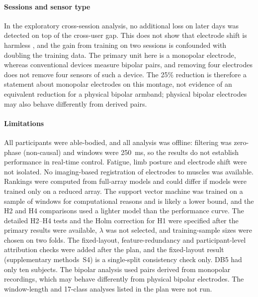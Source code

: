 \paragraph{Sessions and sensor type}
In the exploratory cross-session analysis, no additional loss on later days was detected on top of the cross-user gap. This does not show that electrode shift is harmless \citep{hargrove2006effect,kaufmann2010fluctuating,vidovic2016improving}, and the gain from training on two sessions is confounded with doubling the training data. The primary unit here is a monopolar electrode, whereas conventional devices measure bipolar pairs, and removing four electrodes does not remove four sensors of such a device.  The 25\% reduction is therefore a statement about monopolar electrodes on this montage, not evidence of an equivalent reduction for a physical bipolar armband; physical bipolar electrodes may also behave differently from derived pairs.

\paragraph{Limitations}
All participants were able-bodied, and all analysis was offline: filtering was zero-phase (non-causal) and windows were 250~ms, so the results do not establish performance in real-time control. Fatigue, limb posture and electrode shift were not isolated. No imaging-based registration of electrodes to muscles was available. Rankings were computed from full-array models and could differ if models were trained only on a reduced array. The support vector machine was trained on a sample of windows for computational reasons and is likely a lower bound, and the H2 and H4 comparisons used a lighter model than the performance curve. The detailed H2--H4 tests and the Holm correction for H1 were specified after the primary results were available, $\lambda$ was not selected, and training-sample sizes were chosen on two folds. The fixed-layout, feature-redundancy and participant-level attribution checks were added after the plan, and the fixed-layout result (supplementary methods~S4) is a single-split consistency check only. DB5 had only ten subjects. The bipolar analysis used pairs derived from monopolar recordings, which may behave differently from physical bipolar electrodes. The window-length and 17-class analyses listed in the plan were not run.
